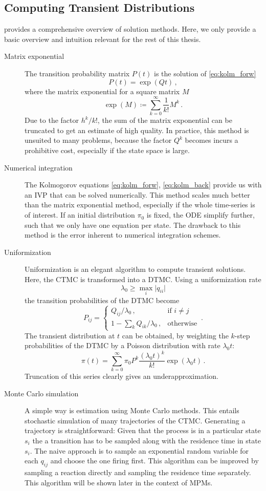 \subsection{Computing Transient Distributions}
\citet{stewart1994introduction} provides a comprehensive overview of solution methods.
Here, we only provide a basic overview and intuition relevant for the rest of this thesis.
\begin{description}
	\item[Matrix exponential]
		The transition probability matrix $P(t)$ is the solution of \eqref{eq:kolm_forw}
		$$
			P(t)=\exp(Qt)\,,
			$$
		where the matrix exponential for a square matrix $M$
		$$
		\exp({M})\coloneqq\sum_{k=0}^{\infty}\frac{1}{k!}M^k\,.
		$$
		Due to the factor ${h^k}/{k!}$, the sum of the matrix exponential
		can be truncated to get an estimate
		of high quality. In practice, this method is unsuited to many problems, because
		the factor $Q^k$ becomes incurs a prohibitive cost, especially if the state space
		is large.
	\item[Numerical integration]
		The Kolmogorov equations \eqref{eq:kolm_forw}, \eqref{eq:kolm_back}
		provide us with an \ac{IVP} that can be solved
		numerically.
		This method scales much better than the matrix exponential method,
		especially if the whole time-series is of interest. If an initial distribution
		$\pi_0$ is fixed, the \ac{ODE} simplify further, such that we only have one equation
		per state.
		The drawback to this method is the error inherent to numerical 
		integration schemes.
	\item[Uniformization]
		Uniformization is an elegant algorithm to compute transient solutions.
		Here, the \ac{CTMC} is transformed into a \ac{DTMC}.
		Using a uniformization rate $$\lambda_0\geq\max_{i}\lvert q_{ii}\rvert$$
		the transition probabilities of the \ac{DTMC} become
		$$
		P_{ij} =
		\begin{cases}
			Q_{ij} / \lambda_0\,, &\text{if } i\neq j\\
			1 - \sum_k Q_{ik} / \lambda_0\,, &\text{otherwise}
		\end{cases}\,.
		$$
		The transient distribution at $t$ can be obtained, by weighting the $k$-step
		probabilities of the \ac{DTMC} by a Poisson distribution with rate
		$\lambda_0 t$:
		$$
		\pi(t) =
		\sum_{k=0}^{\infty}\pi_0P^k\frac{(\lambda_0 t)^k}{k!} \exp{(\lambda_0 t)}\,.
		$$
		Truncation of this series clearly gives an underapproximation.
	\item[Monte Carlo simulation]
		A simple way is estimation using Monte Carlo methods. This entails stochastic
		simulation of many trajectories of the \ac{CTMC}. Generating a trajectory is
		straightforward: Given that the process is in a particular state $s_i$
		the a transition has to be sampled along with the residence time in state
		$s_i$. The naive approach is to sample an exponential random variable for
		each $q_{ij}$ and choose the one firing first.
		This algorithm can be improved by sampling a reaction directly and
		sampling the residence time separately. This algorithm will be shown later
		in the context of \acp{MPM}.
\end{description}

